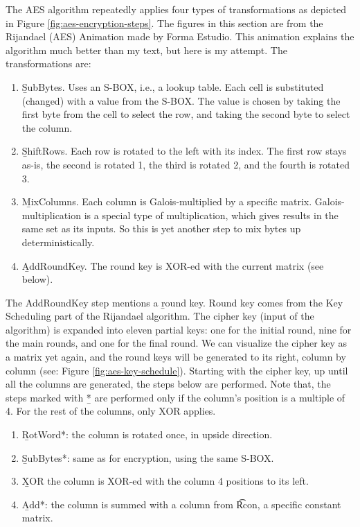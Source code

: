 The AES algorithm repeatedly applies four types of transformations as depicted in Figure \ref{fig:aes-encryption-steps}.
The figures in this section are from the Rijandael (AES) Animation made by Forma Estudio\cite{aesanimation}.
This animation explains the algorithm much better than my text, but here is my attempt.
The transformations are:
\begin{enumerate}
    \item \b{SubBytes}.
        Uses an S-BOX, i.e., a lookup table.
        Each cell is substituted (changed) with a value from the S-BOX.
        The value is chosen by taking the first byte from the cell to select the row, and taking the second byte to select the column.
    \item \b{ShiftRows}.
        Each row is rotated to the left with its index.
        The first row stays as-is, the second is rotated 1, the third is rotated 2, and the fourth is rotated 3.
    \item \b{MixColumns}.
        Each column is Galois-multiplied by a specific matrix.
        Galois-multiplication is a special type of multiplication, which gives results in the same set as its inputs.
        So this is yet another step to mix bytes up deterministically.
    \item \b{AddRoundKey}.
        The round key is XOR-ed with the current matrix (see below).
\end{enumerate}

The AddRoundKey step mentions a \b{round key}.
Round key comes from the Key Scheduling part of the Rijandael algorithm.
The cipher key (input of the algorithm) is expanded into eleven partial keys: one for the initial round, nine for the main rounds, and one for the final round.
We can visualize the cipher key as a matrix yet again, and the round keys will be generated to its right, column by column (see: Figure \ref{fig:aes-key-schedule}).
Starting with the cipher key, up until all the columns are generated, the steps below are performed.
Note that, the steps marked with \b{*} are performed only if the column's position is a multiple of 4.
For the rest of the columns, only XOR applies.
\begin{enumerate}
    \item \b{RotWord*}: the column is rotated once, in upside direction.
    \item \b{SubBytes*}: same as for encryption, using the same S-BOX.
    \item \b{XOR} the column is XOR-ed with the column 4 positions to its left.
    \item \b{Add*}: the column is summed with a column from \t{Rcon}, a specific constant matrix. 
\end{enumerate}

